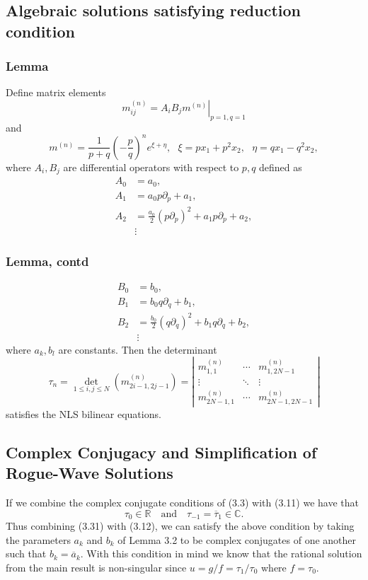 \documentclass{beamer}
\def\CC{\mathbb{C}}
\def\f{\frac}
\theoremstyle{plain}
\theoremstyle{definition}
\begin{document}
%
\subsection{Algebraic solutions satisfying reduction condition}



\frame
{
\frametitle{Lemma}
Define matrix elements $$\left . m_{ij} ^{(n)} = A_i B_j m ^{(n)} \right | _{p=1,q=1}$$ and $$m^{(n)} = \f{1}{p+q} \left ( - \f{p}{q} \right ) ^n e ^{\xi +\eta } , ~~~\xi = px_1 + p^2 x_2, ~~~\eta = q x_1 - q^2 x_2 , $$ where $A_i,B_j$ are differential operators with respect to $p,q$ defined as 
\begin{align*} A_0 & = a_0,\\ A_1&  = a_0 p \partial _p + a_1,\\ A_2 & = \f{a_0}{2} (p \partial _p ) ^2 + a_1 p \partial _p + a_2, \\ & \vdots \end{align*} 
}

\frame
{
\frametitle{Lemma, contd}
\begin{align*} B_0 & = b_0,\\ B_1&  = b_0 q \partial _q + b_1,\\ B_2 & = \f{b_0}{2} (q \partial _q ) ^2 + b_1 q \partial _q + b_2, \\ & \vdots \end{align*} 
where $a_k,b_l$ are constants.  Then the determinant $$ \tau _n = \det _{1 \leq i,j \leq N } ( m^{(n)} _{2i-1,2j-1} ) = \left | \begin{array}{ccc} m _{1,1} ^{(n)} & \cdots & m _{1,2N-1} ^{(n)}\\ \vdots & \ddots & \vdots \\ m _{2N-1,1} ^{(n)} & \cdots & m _{2N-1,2N-1} ^{(n)} \end{array} \right | $$ satisfies the NLS bilinear equations. 
}

\subsection{Complex Conjugacy and Simplification of Rogue-Wave Solutions}

\frame
{

If we combine the complex conjugate conditions of (3.3) with (3.11) we have that 
\begin{equation*}\tag{3.31}
\tau_0\in\mathbb{R} \quad\text{and}\quad\tau_{-1}=\overline{\tau}_1\in\CC.
\end{equation*}
Thus combining (3.31) with (3.12), we can satisfy the above condition by taking the parameters $a_k$ and $b_k$ of Lemma 3.2 to be complex conjugates of one another such that $b_k=\overline{a}_k$. With this condition in mind we know that the rational solution from the main result is non-singular since $u=g/f=\tau_1/\tau_0$ where $f=\tau_0$.%
}
\end{document}
